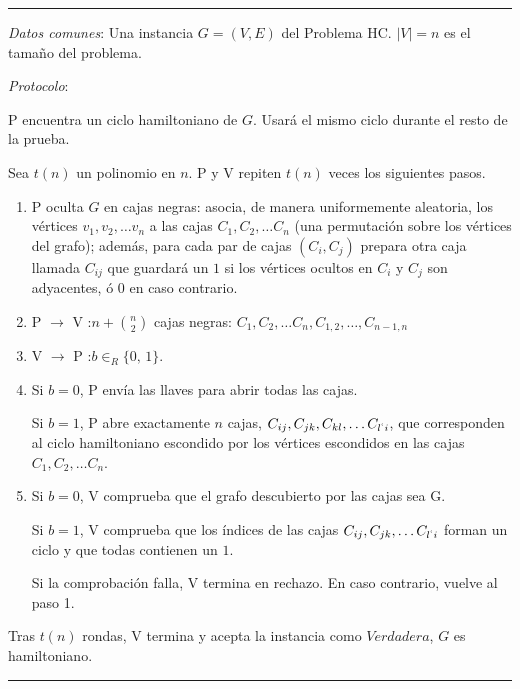 \rule{\textwidth}{1pt}
\begin{algorithm}\label{HCinteractive:alg}
	
	\hfil
	
	\textit{Datos comunes}: Una instancia $G=(V,E)$ del Problema HC. $\mid V \mid = n$ es el tamaño del problema.
	
	\textit{Protocolo}: 
	
	P encuentra un ciclo hamiltoniano de $G$. Usará el mismo ciclo durante el resto de la prueba.
	
	Sea $t(n)$ un polinomio en $n$. P y V repiten $t(n)$ veces los siguientes pasos.
	
	\begin{enumerate}
		
		\item P oculta $G$ en cajas negras: asocia, de manera uniformemente aleatoria, los vértices $v_1, v_2, \dots v_n$ a las cajas $C_1, C_2, \dots C_n$ (una permutación sobre los vértices del grafo); además, para cada par de cajas $(C_i,C_j)$ prepara otra caja llamada $C_{ij}$ que guardará un $1$ si los vértices ocultos en $C_i$ y $C_j$ son adyacentes, ó $0$ en caso contrario.
		
		\item P $\rightarrow$ V :\quad $n + \binom{n}{2}$ cajas negras: $C_1, C_2, \dots C_n, C_{1,2},\dots, C_{n-1,n}$
		
		\item V $\rightarrow$ P :\quad $b \in_R \{0,\,1\}$.
		
		\item Si $b=0$, P envía las llaves para abrir todas las cajas.
		
		Si $b=1$, P abre exactamente $n$ cajas, $C_{ij}, C_{jk}, C_{kl}, \dots C_{l^`i}$, que corresponden al ciclo hamiltoniano escondido por los vértices escondidos en las cajas $C_1, C_2, \dots C_n$.
		
		\item Si $b=0$, V comprueba que el grafo descubierto por las cajas sea G.
		
		Si $b=1$, V comprueba que los índices de las cajas  $C_{ij}, C_{jk}, \dots C_{l^`i}$ forman un ciclo y que todas contienen un $1$.
		
		Si la comprobación falla, V termina en rechazo. En caso contrario, vuelve al paso 1.
		
		
	\end{enumerate}
	
	Tras $t(n)$ rondas, V termina y acepta la instancia como $Verdadera$, $G$ es hamiltoniano.
	
\end{algorithm}
\rule{\textwidth}{1pt}

